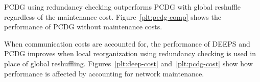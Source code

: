 PCDG using redundancy checking outperforms PCDG with global reshuffle regardless of the maintenance cost. Figure~\ref{plt:pcdg-comp} shows the performance of PCDG without maintenance costs.


When communication costs are accounted for, the performance of DEEPS and PCDG improves when local reorganization using redundancy checking is used in place of global reshuffling. Figures~\ref{plt:deep-cost} and~\ref{plt:pcdg-cost} show how performance is affected by accounting for network maintenance.




